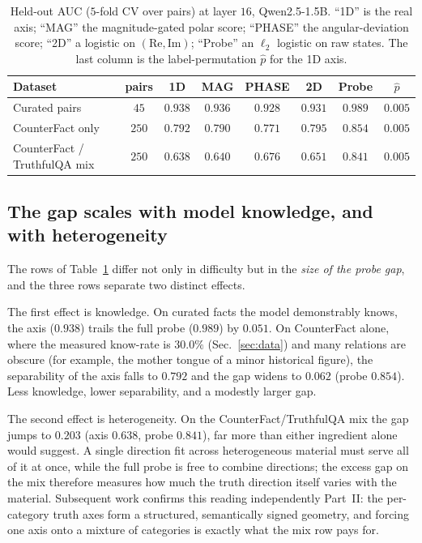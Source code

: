 \documentclass[11pt]{article}
\begin{document}
\begin{table}[t]
\centering
\caption{Held-out AUC ($5$-fold CV over pairs) at layer $16$, Qwen2.5-1.5B.
``1D'' is the real axis; ``MAG'' the magnitude-gated polar score; ``PHASE''
the angular-deviation score; ``2D'' a logistic on
$(\mathrm{Re},\mathrm{Im})$; ``Probe'' an $\ell_2$ logistic on raw states.
The last column is the label-permutation $\hat{p}$ for the 1D axis.}
\label{tab:main}
\begin{tabular}{lccccccc}
\toprule
Dataset & pairs & 1D & MAG & PHASE & 2D & Probe & $\hat{p}$ \\
\midrule
Curated pairs                    & $45$  & $0.938$ & $0.936$ & $0.928$ & $0.931$ & $0.989$ & $0.005$ \\
CounterFact only                 & $250$ & $0.792$ & $0.790$ & $0.771$ & $0.795$ & $0.854$ & $0.005$ \\
CounterFact / TruthfulQA mix     & $250$ & $0.638$ & $0.640$ & $0.676$ & $0.651$ & $0.841$ & $0.005$ \\
\bottomrule
\end{tabular}
\end{table}

\subsection{The gap scales with model knowledge, and with heterogeneity}
\label{sec:dim}

The rows of Table~\ref{tab:main} differ not only in difficulty but in the
\emph{size of the probe gap}, and the three rows separate two distinct
effects.

The first effect is knowledge. On curated facts the model demonstrably knows,
the axis ($0.938$) trails the full probe ($0.989$) by $0.051$. On CounterFact
alone, where the measured know-rate is $30.0\%$ (Sec.~\ref{sec:data}) and
many relations are obscure (for example, the mother tongue of a minor
historical figure), the separability of the axis falls to $0.792$ and the gap
widens to $0.062$ (probe $0.854$). Less knowledge, lower separability, and a
modestly larger gap.

The second effect is heterogeneity. On the CounterFact/TruthfulQA mix the gap
jumps to $0.203$ (axis $0.638$, probe $0.841$), far more than either
ingredient alone would suggest. A single direction fit across heterogeneous
material must serve all of it at once, while the full probe is free to
combine directions; the excess gap on the mix therefore measures how much the
truth direction itself varies with the material. Subsequent work confirms
this reading independently Part~II: the
per-category truth axes form a structured, semantically signed geometry, and
forcing one axis onto a mixture of categories is exactly what the mix row
pays for.
\end{document}
